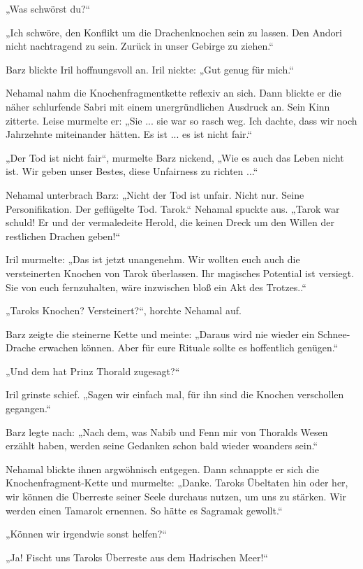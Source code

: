„Was schwörst du?“

„Ich schwöre, den Konflikt um die Drachenknochen sein zu lassen. Den Andori nicht nachtragend zu sein. Zurück in unser Gebirge zu ziehen.“

Barz blickte Iril hoffnungsvoll an. Iril nickte: „Gut genug für mich.“

Nehamal nahm die Knochenfragmentkette reflexiv an sich. Dann blickte er die näher schlurfende Sabri mit einem unergründlichen Ausdruck an. Sein Kinn zitterte. Leise murmelte er: „Sie ... sie war so rasch weg. Ich dachte, dass wir noch Jahrzehnte miteinander hätten. Es ist ... es ist nicht fair.“

„Der Tod ist nicht fair“, murmelte Barz nickend, „Wie es auch das Leben nicht ist. Wir geben unser Bestes, diese Unfairness zu richten ...“

Nehamal unterbrach Barz: „Nicht der Tod ist unfair. Nicht nur. Seine Personifikation. Der geflügelte Tod. Tarok.“ Nehamal spuckte aus. „Tarok war schuld! Er und der vermaledeite Herold, die keinen Dreck um den Willen der restlichen Drachen geben!“

Iril murmelte: „Das ist jetzt unangenehm. Wir wollten euch auch die versteinerten Knochen von Tarok überlassen. Ihr magisches Potential ist versiegt. Sie von euch fernzuhalten, wäre inzwischen bloß ein Akt des Trotzes..“

„Taroks Knochen? Versteinert?“, horchte Nehamal auf.

Barz zeigte die steinerne Kette und meinte: „Daraus wird nie wieder ein Schnee-Drache erwachen können. Aber für eure Rituale sollte es hoffentlich genügen.“

„Und dem hat Prinz Thorald zugesagt?“

Iril grinste schief. „Sagen wir einfach mal, für ihn sind die Knochen verschollen gegangen.“

Barz legte nach: „Nach dem, was Nabib und Fenn mir von Thoralds Wesen erzählt haben, werden seine Gedanken schon bald wieder woanders sein.“

Nehamal blickte ihnen argwöhnisch entgegen. Dann schnappte er sich die Knochenfragment-Kette und murmelte: „Danke. Taroks Übeltaten hin oder her, wir können die Überreste seiner Seele durchaus nutzen, um uns zu stärken. Wir werden einen Tamarok ernennen. So hätte es Sagramak gewollt.“

„Können wir irgendwie sonst helfen?“

„Ja! Fischt uns Taroks Überreste aus dem Hadrischen Meer!“

